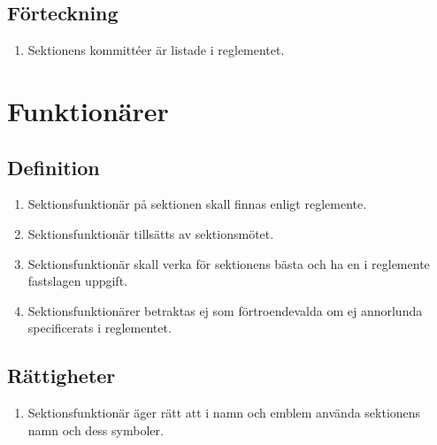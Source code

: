 \documentclass[11pt,a4paper]{article}
\begin{document}
\subsection{Förteckning}

\begin{enumerate}[\thesubsection .1]

  \item Sektionens kommittéer är listade i reglementet.

\end{enumerate}

\newpage

\section{Funktionärer}

\subsection{Definition}

\begin{enumerate}[\thesubsection .1]

  \item Sektionsfunktionär på sektionen skall finnas enligt
  reglemente.

  \item Sektionsfunktionär tillsätts av sektionsmötet.

  \item Sektionsfunktionär skall verka för sektionens bästa och ha en
  i reglemente fastslagen uppgift.

  \item Sektionsfunktionärer betraktas ej som förtroendevalda om ej annorlunda specificerats i reglementet.

\end{enumerate}

\subsection{Rättigheter}

\begin{enumerate}[\thesubsection .1]

  \item Sektionsfunktionär äger rätt att i namn och emblem använda
  sektionens namn och dess symboler.

\end{enumerate}
\end{document}

